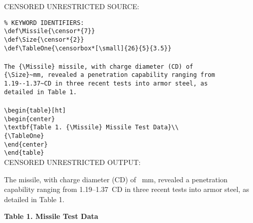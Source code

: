 \documentclass{article}
\begin{document}
{\addtolength{\leftskip}{2.3em}
CENSORED UNRESTRICTED SOURCE: \hrulefill

\verb|% KEYWORD IDENTIFIERS:|\\
\verb|\def\Missile{\censor*{7}}|\\
\verb|\def\Size{\censor*{2}}|\\
\verb|\def\TableOne{\censorbox*[\small]{26}{5}{3.5}}|\\
\verb||\\
\verb|The {\Missile} missile, with charge diameter (CD) of|\\
\verb|{\Size}~mm, revealed a penetration capability ranging from|\\
\verb|1.19--1.37~CD in three recent tests into armor steel, as|\\
\verb|detailed in Table 1.|\\
\verb||\\
\verb|\begin{table}[ht]|\\
\verb|\begin{center}|\\
\verb|\textbf{Table 1. {\Missile} Missile Test Data}\\|\\
\verb|{\TableOne}|\\
\verb|\end{center}|\\
\verb|\end{table}|\\

CENSORED UNRESTRICTED OUTPUT: \hrulefill

\def\Missile{\censor*{7}}
\def\Size{\censor*{2}}
\def\TableOne{\censorbox*[\small]{26}{5}{3.5}}

The {\Missile} missile, with charge diameter (CD) of {\Size}~mm, revealed a
penetration capability ranging from 1.19--1.37~CD in three recent tests
into armor steel, as detailed in Table 1.

\begin{table}[ht]
\begin{center}
\textbf{Table 1. {\Missile} Missile Test Data}\\
{\TableOne}
\end{center}
\end{table}

\hrulefill

}
\end{document}
